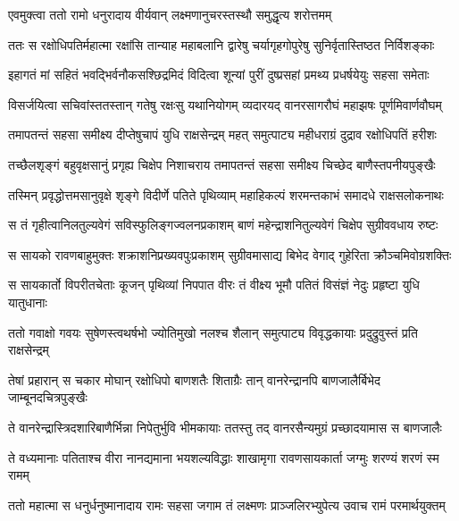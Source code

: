 \twolineshloka
{एवमुक्त्वा ततो रामो धनुरादाय वीर्यवान्}
{लक्ष्मणानुचरस्तस्थौ समुद्धृत्य शरोत्तमम्} %

\twolineshloka
{ततः स रक्षोधिपतिर्महात्मा रक्षांसि तान्याह महाबलानि}
{द्वारेषु चर्यागृहगोपुरेषु सुनिर्वृतास्तिष्ठत निर्विशङ्काः} %

\twolineshloka
{इहागतं मां सहितं भवद्भिर्वनौकसश्छिद्रमिदं विदित्वा}
{शून्यां पुरीं दुष्प्रसहां प्रमथ्य प्रधर्षयेयुः सहसा समेताः} %

\twolineshloka
{विसर्जयित्वा सचिवांस्ततस्तान् गतेषु रक्षःसु यथानियोगम्}
{व्यदारयद् वानरसागरौघं महाझषः पूर्णमिवार्णवौघम्} %

\twolineshloka
{तमापतन्तं सहसा समीक्ष्य दीप्तेषुचापं युधि राक्षसेन्द्रम्}
{महत् समुत्पाट्य महीधराग्रं दुद्राव रक्षोधिपतिं हरीशः} %

\twolineshloka
{तच्छैलशृङ्गं बहुवृक्षसानुं प्रगृह्य चिक्षेप निशाचराय}
{तमापतन्तं सहसा समीक्ष्य चिच्छेद बाणैस्तपनीयपुङ्खैः} %

\twolineshloka
{तस्मिन् प्रवृद्धोत्तमसानुवृक्षे शृङ्गे विदीर्णे पतिते पृथिव्याम्}
{महाहिकल्पं शरमन्तकाभं समादधे राक्षसलोकनाथः} %

\twolineshloka
{स तं गृहीत्वानिलतुल्यवेगं सविस्फुलिङ्गज्वलनप्रकाशम्}
{बाणं महेन्द्राशनितुल्यवेगं चिक्षेप सुग्रीववधाय रुष्टः} %

\twolineshloka
{स सायको रावणबाहुमुक्तः शक्राशनिप्रख्यवपुःप्रकाशम्}
{सुग्रीवमासाद्य बिभेद वेगाद् गुहेरिता क्रौञ्चमिवोग्रशक्तिः} %

\twolineshloka
{स सायकार्तो विपरीतचेताः कूजन् पृथिव्यां निपपात वीरः}
{तं वीक्ष्य भूमौ पतितं विसंज्ञं नेदुः प्रहृष्टा युधि यातुधानाः} %

\twolineshloka
{ततो गवाक्षो गवयः सुषेणस्त्वथर्षभो ज्योतिमुखो नलश्च}
{शैलान् समुत्पाट्य विवृद्धकायाः प्रदुद्रुवुस्तं प्रति राक्षसेन्द्रम्} %

\twolineshloka
{तेषां प्रहारान् स चकार मोघान् रक्षोधिपो बाणशतैः शिताग्रैः}
{तान् वानरेन्द्रानपि बाणजालैर्बिभेद जाम्बूनदचित्रपुङ्खैः} %

\twolineshloka
{ते वानरेन्द्रास्त्रिदशारिबाणैर्भिन्ना निपेतुर्भुवि भीमकायाः}
{ततस्तु तद् वानरसैन्यमुग्रं प्रच्छादयामास स बाणजालैः} %

\twolineshloka
{ते वध्यमानाः पतिताश्च वीरा नानद्यमाना भयशल्यविद्धाः}
{शाखामृगा रावणसायकार्ता जग्मुः शरण्यं शरणं स्म रामम्} %

\twolineshloka
{ततो महात्मा स धनुर्धनुष्मानादाय रामः सहसा जगाम}
{तं लक्ष्मणः प्राञ्जलिरभ्युपेत्य उवाच रामं परमार्थयुक्तम्} %

